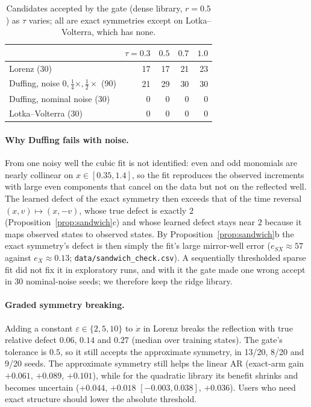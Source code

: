 \begin{table}[h]
\centering\small
\caption{Candidates accepted by the gate (dense library, $r=0.5$) as $\tau$ varies; all are exact symmetries except on Lotka--Volterra, which has none.}
\setlength{\tabcolsep}{6pt}
\begin{tabular}{lrrrr}
\toprule
 & $\tau=0.3$ & $0.5$ & $0.7$ & $1.0$\\
\midrule
Lorenz (30) & 17 & 17 & 21 & 23\\
Duffing, noise $0,\tfrac14\times,\tfrac12\times$ (90) & 21 & 29 & 30 & 30\\
Duffing, nominal noise (30) & 0 & 0 & 0 & 0\\
Lotka--Volterra (30) & 0 & 0 & 0 & 0\\
\bottomrule
\end{tabular}
\end{table}

\paragraph{Why Duffing fails with noise.} From one noisy well the cubic fit is not identified: even and odd monomials are nearly collinear on $x\in[0.35,1.4]$, so the fit reproduces the observed increments with large even components that cancel on the data but not on the reflected well. The learned defect of the exact symmetry then exceeds that of the time reversal $(x,v)\mapsto(x,-v)$, whose true defect is exactly $2$ (Proposition~\ref{prop:sandwich}c) and whose learned defect stays near $2$ because it maps observed states to observed states. By Proposition~\ref{prop:sandwich}b the exact symmetry's defect is then simply the fit's large mirror-well error ($e_{SX}\approx57$ against $e_X\approx0.13$; \texttt{data/sandwich\_check.csv}). A sequentially thresholded sparse fit did not fix it in exploratory runs, and with it the gate made one wrong accept in 30 nominal-noise seeds; we therefore keep the ridge library.

\paragraph{Graded symmetry breaking.} Adding a constant $\varepsilon\in\{2,5,10\}$ to $\dot x$ in Lorenz breaks the reflection with true relative defect $0.06$, $0.14$ and $0.27$ (median over training states). The gate's tolerance is $0.5$, so it still accepts the approximate symmetry, in 13/20, 8/20 and 9/20 seeds. The approximate symmetry still helps the linear AR (exact-arm gain $+0.061$, $+0.089$, $+0.101$), while for the quadratic library its benefit shrinks and becomes uncertain ($+0.044$, $+0.018$ $[-0.003,0.038]$, $+0.036$). Users who need exact structure should lower the absolute threshold.

